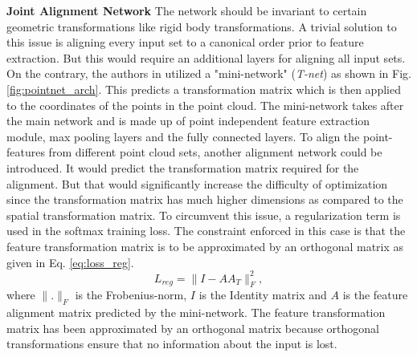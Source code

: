 \textbf{Joint Alignment Network} The network should be invariant to certain geometric transformations like rigid body transformations. A trivial solution to this issue is aligning every input set to a canonical order prior to feature extraction. But this would require an additional layers for aligning all input sets. On the contrary, the authors in \cite{qi2017pointnet} utilized a "mini-network" (\textit{T-net}) as shown in Fig. \ref{fig:pointnet_arch}. This predicts a transformation matrix which is then applied to the coordinates of the points in the point cloud. The mini-network takes after the main network and is made up of point independent feature extraction module, max pooling layers and the fully connected layers. To align the point-features from different point cloud sets, another alignment network could be introduced. It would predict the transformation matrix required for the alignment. But that would significantly increase the difficulty of optimization since the transformation matrix has much higher dimensions as compared to the spatial transformation matrix. To circumvent this issue, a regularization term is used in the softmax training loss. The constraint enforced in this case is that the feature transformation matrix is to be approximated by an orthogonal matrix as given in Eq. \ref{eq:loss_reg}.
\begin{equation}
    \label{eq:loss_reg}
    L_{reg} = \lVert I - AA_T \rVert _F^2,
\end{equation}
where $\lVert . \rVert _F$ is the Frobenius-norm, $I$ is the Identity matrix and $A$ is the feature alignment matrix predicted by the mini-network. The feature transformation matrix has been approximated by an orthogonal matrix because orthogonal transformations ensure that no information about the input is lost.

